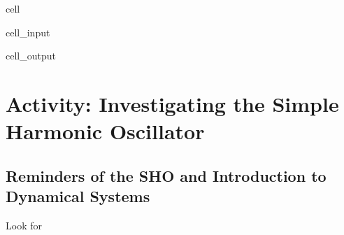 \documentclass[letterpaper,10pt,english]{jupyterBook}
\begin{document}
\begin{sphinxuseclass}{cell}\begin{sphinxVerbatimInput}

\begin{sphinxuseclass}{cell_input}
\begin{sphinxVerbatim}[commandchars=\\\{\}]
  
\end{sphinxVerbatim}

\end{sphinxuseclass}\end{sphinxVerbatimInput}
\begin{sphinxVerbatimOutput}

\begin{sphinxuseclass}{cell_output}
\noindent{}

\end{sphinxuseclass}\end{sphinxVerbatimOutput}

\end{sphinxuseclass}
\sphinxstepscope


\section{Activity: Investigating the Simple Harmonic Oscillator}
\label{\detokenize{content/2_oscillations/activity-SHO_and_dynamical_systems:activity-investigating-the-simple-harmonic-oscillator}}\label{\detokenize{content/2_oscillations/activity-SHO_and_dynamical_systems::doc}}

\subsection{Reminders of the SHO and Introduction to Dynamical Systems}
\label{\detokenize{content/2_oscillations/activity-SHO_and_dynamical_systems:reminders-of-the-sho-and-introduction-to-dynamical-systems}}
\sphinxAtStartPar
Look for 
\end{document}
